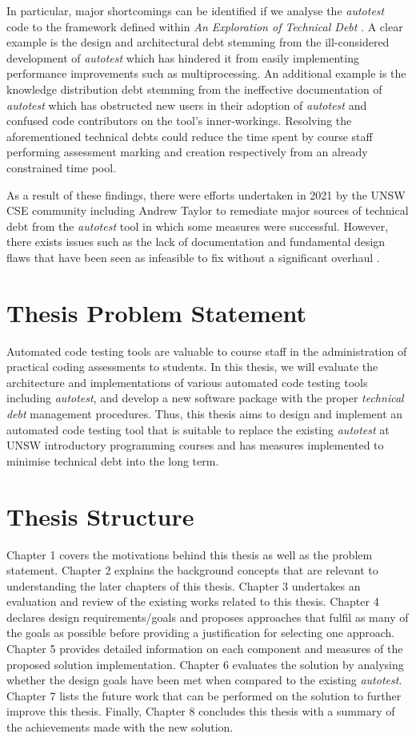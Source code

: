 \documentclass[hidelinks]{report}
\begin{document}
In particular, major shortcomings can be identified if we analyse the \textit{autotest} code to the framework defined within \textit{An Exploration of Technical Debt} \cite{TechnicalDebt}. A clear example is the design and architectural debt stemming from the ill-considered development of \textit{autotest} which has hindered it from easily implementing performance improvements such as multiprocessing. An additional example is the knowledge distribution debt stemming from the ineffective documentation of \textit{autotest} which has obstructed new users in their adoption of \textit{autotest} and confused code contributors on the tool's inner-workings. Resolving the aforementioned technical debts could reduce the time spent by course staff performing assessment marking and creation respectively from an already constrained time pool.

As a result of these findings, there were efforts undertaken in 2021 by the UNSW CSE community including Andrew Taylor to remediate major sources of technical debt from the \textit{autotest} tool in which some measures were successful. However, there exists issues such as the lack of documentation and fundamental design flaws that have been seen as infeasible to fix without a significant overhaul \cite{AutotestIssues}.

\section{Thesis Problem Statement}
Automated code testing tools are valuable to course staff in the administration of practical coding assessments to students. In this thesis, we will evaluate the architecture and implementations of various automated code testing tools including \textit{autotest}, and develop a new software package with the proper \textit{technical debt} management procedures. Thus, this thesis aims to design and implement an automated code testing tool that is suitable to replace the existing \textit{autotest} at UNSW introductory programming courses and has measures implemented to minimise technical debt into the long term.

\section{Thesis Structure}
Chapter 1 covers the motivations behind this thesis as well as the problem statement.
Chapter 2 explains the background concepts that are relevant to understanding the later chapters of this thesis.
Chapter 3 undertakes an evaluation and review of the existing works related to this thesis.
Chapter 4 declares design requirements/goals and proposes approaches that fulfil as many of the goals as possible before providing a justification for selecting one approach.
Chapter 5 provides detailed information on each component and measures of the proposed solution implementation.
Chapter 6 evaluates the solution by analysing whether the design goals have been met when compared to the existing \textit{autotest}.
Chapter 7 lists the future work that can be performed on the solution to further improve this thesis. 
Finally, Chapter 8 concludes this thesis with a summary of the achievements made with the new solution.
\end{document}
